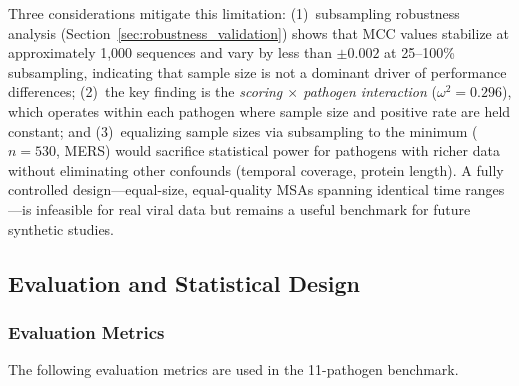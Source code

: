Three considerations mitigate this limitation:
(1)~subsampling robustness analysis (Section~\ref{sec:robustness_validation}) shows that MCC values stabilize at approximately 1,000 sequences and vary by less than $\pm 0.002$ at 25--100\% subsampling, indicating that sample size is not a dominant driver of performance differences;
(2)~the key finding is the \emph{scoring $\times$ pathogen interaction} ($\omega^2 = 0.296$), which operates within each pathogen where sample size and positive rate are held constant;
and (3)~equalizing sample sizes via subsampling to the minimum ($n = 530$, MERS) would sacrifice statistical power for pathogens with richer data without eliminating other confounds (temporal coverage, protein length).
A fully controlled design---equal-size, equal-quality MSAs spanning identical time ranges---is infeasible for real viral data but remains a useful benchmark for future synthetic studies.

\subsection{Evaluation and Statistical Design}
\label{sec:eval_stat_design}

\subsubsection{Evaluation Metrics}
\label{subsec:9pathogen_metrics}

The following evaluation metrics are used in the 11-pathogen benchmark.

